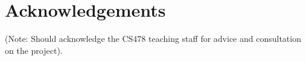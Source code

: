 \documentclass[annual, 12pt]{acmsiggraph}
\begin{document}
\section*{Acknowledgements}
(Note: Should acknowledge the CS478 teaching staff for advice and consultation on the project). 




\end{document}
